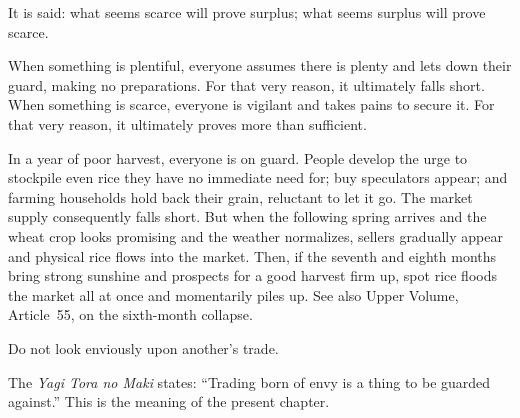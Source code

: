 
\begin{sokyubox}
{\small\itshape\color{sokyubar} }

\medskip
It is said: what seems scarce will prove surplus; what seems surplus
will prove scarce.

When something is plentiful, everyone assumes there is plenty and
lets down their guard, making no preparations. For that very reason,
it ultimately falls short. When something is scarce, everyone is
vigilant and takes pains to secure it. For that very reason, it
ultimately proves more than sufficient.
\end{sokyubox}

\commentary
In a year of poor harvest, everyone is on guard. People develop the
urge to stockpile even rice they have no immediate need for; buy
speculators appear; and farming households hold back their grain,
reluctant to let it go. The market supply consequently falls short.
But when the following spring arrives and the wheat crop looks
promising and the weather normalizes, sellers gradually appear and
physical rice flows into the market. Then, if the seventh and eighth
months bring strong sunshine and prospects for a good harvest firm up,
spot rice floods the market all at once and momentarily piles up.
See also Upper Volume, Article~55, on the sixth-month collapse.


\begin{sokyubox}
{\small\itshape\color{sokyubar} }

\medskip
Do not look enviously upon another's trade.

The \textit{Yagi Tora no Maki} states: ``Trading born of envy is a thing to
be guarded against.'' This is the meaning of the present chapter.
\end{sokyubox}


